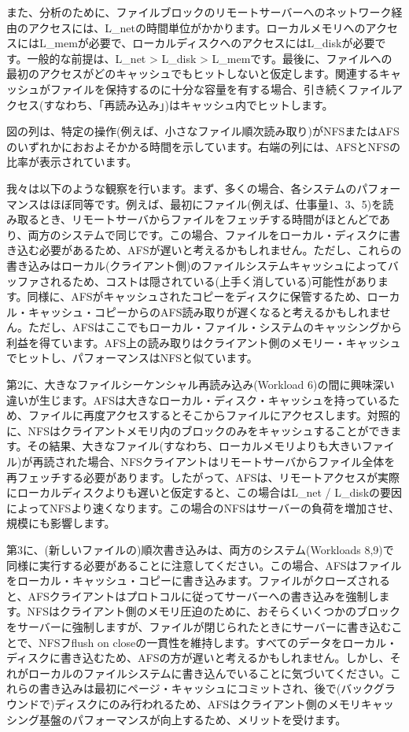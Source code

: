 また、分析のために、ファイルブロックのリモートサーバーへのネットワーク経由のアクセスには、L\_netの時間単位がかかります。ローカルメモリへのアクセスにはL\_memが必要で、ローカルディスクへのアクセスにはL\_diskが必要です。一般的な前提は、L\_net
\textgreater{} L\_disk \textgreater{}
L\_memです。最後に、ファイルへの最初のアクセスがどのキャッシュでもヒットしないと仮定します。関連するキャッシュがファイルを保持するのに十分な容量を有する場合、引き続くファイルアクセス(すなわち、「再読み込み」)はキャッシュ内でヒットします。

図の列は、特定の操作(例えば、小さなファイル順次読み取り)がNFSまたはAFSのいずれかにおおよそかかる時間を示しています。右端の列には、AFSとNFSの比率が表示されています。

我々は以下のような観察を行います。まず、多くの場合、各システムのパフォーマンスはほぼ同等です。例えば、最初にファイル(例えば、仕事量1、3、5)を読み取るとき、リモートサーバからファイルをフェッチする時間がほとんどであり、両方のシステムで同じです。この場合、ファイルをローカル・ディスクに書き込む必要があるため、AFSが遅いと考えるかもしれません。ただし、これらの書き込みはローカル(クライアント側)のファイルシステムキャッシュによってバッファされるため、コストは隠されている(上手く消している)可能性があります。同様に、AFSがキャッシュされたコピーをディスクに保管するため、ローカル・キャッシュ・コピーからのAFS読み取りが遅くなると考えるかもしれません。ただし、AFSはここでもローカル・ファイル・システムのキャッシングから利益を得ています。AFS上の読み取りはクライアント側のメモリー・キャッシュでヒットし、パフォーマンスはNFSと似ています。

第2に、大きなファイルシーケンシャル再読み込み(Workload
6)の間に興味深い違いが生じます。AFSは大きなローカル・ディスク・キャッシュを持っているため、ファイルに再度アクセスするとそこからファイルにアクセスします。対照的に、NFSはクライアントメモリ内のブロックのみをキャッシュすることができます。その結果、大きなファイル(すなわち、ローカルメモリよりも大きいファイル)が再読された場合、NFSクライアントはリモートサーバからファイル全体を再フェッチする必要があります。したがって、AFSは、リモートアクセスが実際にローカルディスクよりも遅いと仮定すると、この場合はL\_net
/
L\_diskの要因によってNFSより速くなります。この場合のNFSはサーバーの負荷を増加させ、規模にも影響します。

第3に、(新しいファイルの)順次書き込みは、両方のシステム(Workloads
8,9)で同様に実行する必要があることに注意してください。この場合、AFSはファイルをローカル・キャッシュ・コピーに書き込みます。ファイルがクローズされると、AFSクライアントはプロトコルに従ってサーバーへの書き込みを強制します。NFSはクライアント側のメモリ圧迫のために、おそらくいくつかのブロックをサーバーに強制しますが、ファイルが閉じられたときにサーバーに書き込むことで、NFSフflush
on
closeの一貫性を維持します。すべてのデータをローカル・ディスクに書き込むため、AFSの方が遅いと考えるかもしれません。しかし、それがローカルのファイルシステムに書き込んでいることに気づいてください。これらの書き込みは最初にページ・キャッシュにコミットされ、後で(バックグラウンドで)ディスクにのみ行われるため、AFSはクライアント側のメモリキャッシング基盤のパフォーマンスが向上するため、メリットを受けます。

